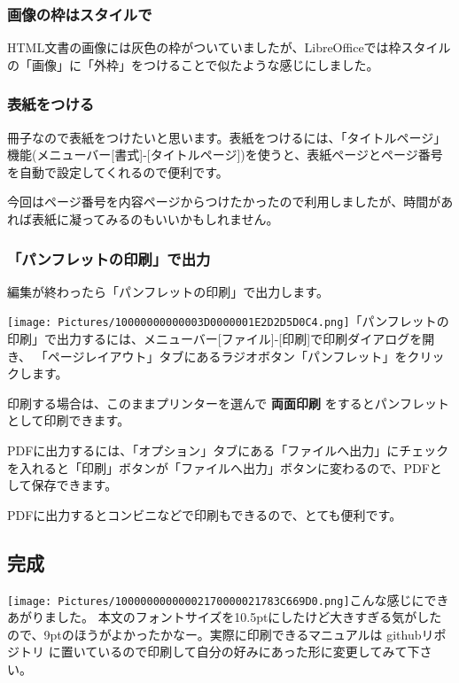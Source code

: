 \documentclass[]{article}
\begin{document}
\subsubsection{画像の枠はスタイルで}\label{ux753bux50cfux306eux67a0ux306fux30b9ux30bfux30a4ux30ebux3067}

HTML文書の画像には灰色の枠がついていましたが、LibreOfficeでは枠スタイルの「画像」に「外枠」をつけることで似たような感じにしました。

\subsubsection{表紙をつける}\label{ux8868ux7d19ux3092ux3064ux3051ux308b}

冊子なので表紙をつけたいと思います。表紙をつけるには、「タイトルページ」機能(メニューバー{[}書式{]}-{[}タイトルページ{]})を使うと、表紙ページとページ番号を自動で設定してくれるので便利です。

今回はページ番号を内容ページからつけたかったので利用しましたが、時間があれば表紙に凝ってみるのもいいかもしれません。

\subsubsection{「パンフレットの印刷」で出力}\label{ux30d1ux30f3ux30d5ux30ecux30c3ux30c8ux306eux5370ux5237ux3067ux51faux529b}

編集が終わったら「パンフレットの印刷」で出力します。

\texttt{[image: Pictures/10000000000003D0000001E2D2D5D0C4.png]}「パンフレットの印刷」で出力するには、メニューバー{[}ファイル{]}-{[}印刷{]}で印刷ダイアログを開き、
「ページレイアウト」タブにあるラジオボタン「パンフレット」をクリックします。

印刷する場合は、このままプリンターを選んで \textbf{両面印刷}
をするとパンフレットとして印刷できます。

PDFに出力するには、「オプション」タブにある「ファイルへ出力」にチェックを入れると「印刷」ボタンが「ファイルへ出力」ボタンに変わるので、PDFとして保存できます。

PDFに出力するとコンビニなどで印刷もできるので、とても便利です。

\subsection{完成}\label{ux5b8cux6210}

\texttt{[image: Pictures/10000000000002170000021783C669D0.png]}こんな感じにできあがりました。
本文のフォントサイズを10.5ptにしたけど大きすぎる気がしたので、9ptのほうがよかったかなー。実際に印刷できるマニュアルは
githubリポジトリ
に置いているので印刷して自分の好みにあった形に変更してみて下さい。
\end{document}
